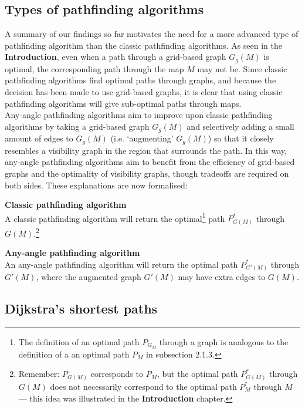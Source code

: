 \documentclass[12pt,notitlepage]{report}
\begin{document}
\subsection {Types of pathfinding algorithms}

A summary of our findings so far motivates the need for a more advanced type of pathfinding algorithm than the classic pathfinding algorithms. As seen in the {\bfseries Introduction}, even when a path through a grid-based graph $G_{g}(M)$ is optimal, the corresponding path through the map $M$ may not be. Since classic pathfinding algorithms find optimal paths through graphs, and because the decision has been made to use grid-based graphs, it is clear that using classic pathfinding algorithms will give sub-optimal paths through maps.\\

\noindent
Any-angle pathfinding algorithms aim to improve upon classic pathfinding algorithms by taking a grid-based graph $G_{g}(M)$ and selectively adding a small amount of edges to $G_{g}(M)$ (i.e. `augmenting' $G_{g}(M)$) so that it closely resembles a visibility graph in the region that surrounds the path. In this way, any-angle pathfinding algorithms aim to benefit from the efficiency of grid-based graphs and the optimality of visibility graphs, though tradeoffs are required on both sides. These explanations are now formalised:

\begin{description}
\item{\bfseries Classic pathfinding algorithm}\\ 
A classic pathfinding algorithm will return the optimal\footnote{The definition of an optimal path $P_{G_{M}}$ through a graph is analogous to the definition of a an optimal path $P_{M}$ in subsection 2.1.3.}  path $P^{*}_{G(M)}$ through $G(M)$.\footnote{Remember: $P_{G(M)}$ corresponds to $P_{M}$, but the optimal path $P^{*}_{G(M)}$ through $G(M)$ does not necessarily correspond to the optimal path $P^{*}_{M}$ through $M$ --- this idea was illustrated in the {\bfseries Introduction} chapter.}
\item{\bfseries Any-angle pathfinding algorithm}\\
An any-angle pathfinding algorithm will return the optimal path $P^{*}_{G'(M)}$ through $G'(M)$, where the augmented graph $G'(M)$ may have extra edges to $G(M)$.
\end{description}

\subsection {Dijkstra's shortest paths}
\end{document}
